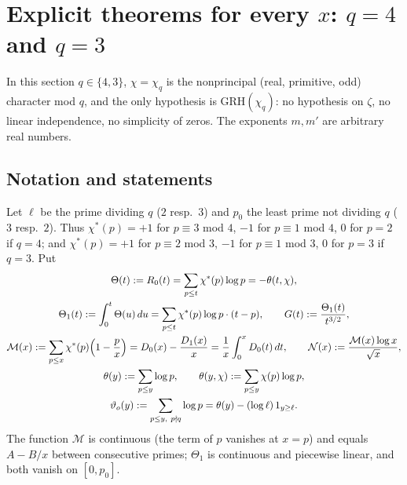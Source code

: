 \documentclass[11pt]{amsart}
\theoremstyle{definition}
\numberwithin{equation}{section}
\newcommand{\cM}{\mathcal M}          %
\newcommand{\cN}{\mathcal N}          %
\newcommand{\vth}{\vartheta_{o}}      %
\begin{document}
\section{Explicit theorems for every \texorpdfstring{$x$}{x}:
\texorpdfstring{$q=4$ and $q=3$}{q=4 and q=3}}\label{sec:explicit}

In this section $q\in\{4,3\}$, $\chi=\chi_q$ is the nonprincipal
(real, primitive, odd) character mod $q$, and the only hypothesis is
GRH$(\chi_q)$: no hypothesis on $\zeta$, no linear independence, no
simplicity of zeros. The exponents $m,m'$ are arbitrary real numbers.

\subsection{Notation and statements}\label{subsec:explicitstatements}

Let $\ell$ be the prime dividing $q$ ($2$ resp.\ $3$) and $p_0$ the
least prime not dividing $q$ ($3$ resp.\ $2$). Thus
$\chi^*(p)=+1$ for $p\equiv3$ mod $4$, $-1$ for $p\equiv1$ mod $4$,
$0$ for $p=2$ if $q=4$; and $\chi^*(p)=+1$ for $p\equiv2$ mod $3$,
$-1$ for $p\equiv1$ mod $3$, $0$ for $p=3$ if $q=3$. Put
\begin{gather*}
\Theta(t):=R_0(t)=\sum_{p\le t}\chi^*(p)\log p=-\theta(t,\chi),\\
\Theta_1(t):=\int_0^t\Theta(u)\,du=\sum_{p\le t}\chi^*(p)\log p\cdot(t-p),
\qquad
G(t):=\frac{\Theta_1(t)}{t^{3/2}},\\
\cM(x):=\sum_{p\le x}\chi^*(p)\Bigl(1-\frac px\Bigr)
=D_0(x)-\frac{D_1(x)}x=\frac1x\int_0^xD_0(t)\,dt,
\qquad
\cN(x):=\frac{\cM(x)\log x}{\sqrt x},\\
\theta(y):=\sum_{p\le y}\log p,\qquad
\theta(y,\chi):=\sum_{p\le y}\chi(p)\log p,\\
\vth(y):=\sum_{p\le y,\ p\nmid q}\log p=\theta(y)-(\log\ell)\,1_{y\ge\ell}.
\end{gather*}
The function $\cM$ is continuous (the term of $p$ vanishes at $x=p$)
and equals $A-B/x$ between consecutive primes; $\Theta_1$ is
continuous and piecewise linear, and both vanish on $[0,p_0]$.
\end{document}
